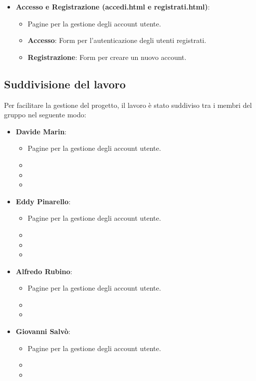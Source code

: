 \documentclass[a4paper, 12pt]{article}
\begin{document}
\begin{justify}
\begin{itemize}
\begin{itemize}
        \end{itemize}
    \item \textbf{Accesso e Registrazione (accedi.html e registrati.html)}:
        \begin{itemize}
            \item Pagine per la gestione degli account utente.
            \item \textbf{Accesso}: Form per l'autenticazione degli utenti registrati.
            \item \textbf{Registrazione}: Form per creare un nuovo account.
        \end{itemize}
\end{itemize}

\subsection{Suddivisione del lavoro}
Per facilitare la gestione del progetto, il lavoro è stato suddiviso tra i membri del gruppo nel seguente modo:
\begin{itemize}
    \item \textbf{Davide Marin}: 
        \begin{itemize}
            \item Pagine per la gestione degli account utente.
            \item
            \item
            \item 
        \end{itemize}
    \item \textbf{Eddy Pinarello}:
        \begin{itemize}
            \item Pagine per la gestione degli account utente.
            \item
            \item
            \item
        \end{itemize}
    \item \textbf{Alfredo Rubino}:
        \begin{itemize}
            \item Pagine per la gestione degli account utente.
            \item
            \item
        \end{itemize}
    \item \textbf{Giovanni Salvò}:
        \begin{itemize}
            \item Pagine per la gestione degli account utente.
            \item
            \item
        \end{itemize}
\end{itemize}



\end{justify}
\end{document}
